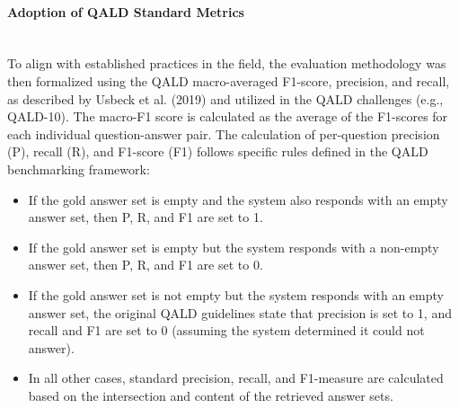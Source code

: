 \paragraph{Adoption of QALD Standard Metrics} \mbox{}\\
To align with established practices in the field, the evaluation methodology was then formalized using the QALD macro-averaged F1-score, precision, and recall, as described by Usbeck et al. (2019) and utilized in the QALD challenges (e.g., QALD-10).
The macro-F1 score is calculated as the average of the F1-scores for each individual question-answer pair.
The calculation of per-question precision (P), recall (R), and F1-score (F1) follows specific rules defined in the QALD benchmarking framework:
\begin{itemize}
    \item If the gold answer set is empty and the system also responds with an empty answer set, then P, R, and F1 are set to 1.
    \item If the gold answer set is empty but the system responds with a non-empty answer set, then P, R, and F1 are set to 0.
    \item If the gold answer set is not empty but the system responds with an empty answer set, the original QALD guidelines state that precision is set to 1, and recall and F1 are set to 0 (assuming the system determined it could not answer).
    \item In all other cases, standard precision, recall, and F1-measure are calculated based on the intersection and content of the retrieved answer sets.
\end{itemize}

